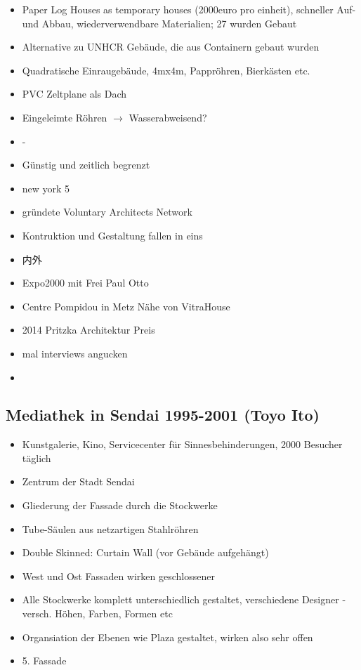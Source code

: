 \documentclass[emulatestandardclasses]{scrartcl}
\begin{document}
\begin{itemize}
  \item Paper Log Houses as temporary houses (2000euro pro einheit), schneller Auf-und Abbau, wiederverwendbare Materialien; 27 wurden Gebaut
  \item Alternative zu UNHCR Gebäude, die aus Containern gebaut wurden
  \item Quadratische Einraugebäude, 4mx4m, Pappröhren, Bierkästen etc.
  \item PVC Zeltplane als Dach
  \item Eingeleimte Röhren $\rightarrow$ Wasserabweisend?
  \item -
  \item Günstig und zeitlich begrenzt
  \item new york 5
  \item gründete Voluntary Architects Network
  \item Kontruktion und Gestaltung fallen in eins
  \item 内外
  \item Expo2000 mit Frei Paul Otto
  \item Centre Pompidou in Metz Nähe von VitraHouse
  \item 2014 Pritzka Architektur Preis 
  \item mal interviews angucken
  \item 
\end{itemize}


\subsection{Mediathek in Sendai 1995-2001 (Toyo Ito)}

\begin{itemize}
  \item Kunstgalerie, Kino, Servicecenter für Sinnesbehinderungen, 2000 Besucher täglich
  \item Zentrum der Stadt Sendai
  \item Gliederung der Fassade durch die Stockwerke
  \item Tube-Säulen aus netzartigen Stahlröhren
  \item Double Skinned: Curtain Wall (vor Gebäude aufgehängt)
  \item West und Ost Fassaden wirken geschlossener
  \item Alle Stockwerke komplett unterschiedlich gestaltet, verschiedene Designer - versch. Höhen, Farben, Formen etc
  \item Organsiation der Ebenen wie Plaza gestaltet, wirken also sehr offen
  \item 5. Fassade
\end{itemize}
\end{document}
